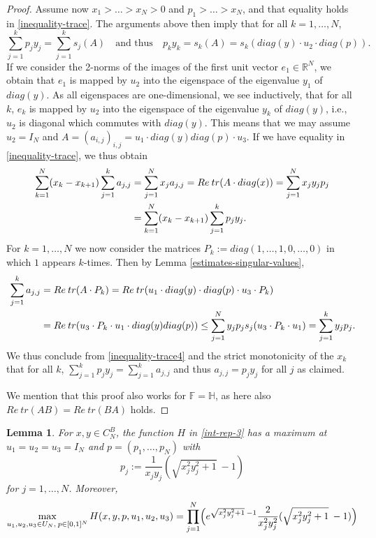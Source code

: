 \documentclass[reqno]{amsart}
\theoremstyle{plain}
\newtheorem{lemma}[theorem]{Lemma}
\theoremstyle{definition}
\numberwithin{equation}{section}
\begin{document}
\begin{proof}
 Assume now  $x_1>\ldots>x_N>0$ and $p_1>\ldots>x_N$, and that equality holds in \eqref{inequality-trace}. The arguments above
 then imply that for all $k=1,\ldots,N$,
$$\sum_{j=1}^k p_jy_j=\sum_{j=1}^k s_j(A) \quad\text{and thus}\quad  p_ky_k=s_k(A)=s_k(diag(y)  \cdot u_2 \cdot  diag(p)).$$
 If we consider the 2-norms of the images of the first unit vector $e_1\in\mathbb R^N$, we obtain that $e_1$
 is mapped by $u_2$ into the eigenspace of the eigenvalue $y_1$ of $diag(y)$. As all eigenspaces are one-dimensional, we see
 inductively, that for all $k$, $e_k$ is mapped by $u_2$ into the eigenspace of the eigenvalue $y_k$ of $diag(y)$, i.e.,
  $u_2$ is  diagonal  which commutes with $diag(y)$. This means that we may assume  $u_2=I_N$
  and  $A=(a_{i,j})_{i,j}=u_1 \cdot diag(y)   diag(p) \cdot u_3$.
 If we have equality in \eqref{inequality-trace}, we thus obtain 
 \begin{align} \label{inequality-trace4} 
   \sum_{k=1}^N (x_k-x_{k+1})\sum_{j=1}^k a_{j,j}&= \sum_{j=1}^N x_j a_{j,j} = Re\> tr(A\cdot diag(x))= \sum_{j=1}^Nx_jy_jp_j \notag\\
   &=
 \sum_{k=1}^N (x_k-x_{k+1})\sum_{j=1}^k p_jy_j .\end{align} 
For  $k=1,\ldots,N$ we now consider the matrices $P_k:=diag(1,\ldots,1,0,\ldots,0)$ in which $1$ appears $k$-times.
Then by Lemma \ref{estimates-singular-values},
\begin{align} \sum_{j=1}^k a_{j,j} &= Re\> tr(A\cdot P_k)=  Re\> tr(u_1 \cdot diag(y)  \cdot  diag(p) \cdot u_3 \cdot P_k)\notag\\
  &=  Re\> tr( u_3 \cdot P_k\cdot u_1 \cdot diag(y) diag(p))  \le
  \sum_{j=1}^N y_jp_j s_j( u_3 \cdot P_k\cdot u_1) = \sum_{j=1}^k y_jp_j  .\notag\end{align} 
  We thus conclude from \eqref{inequality-trace4} and the strict monotonicity of the $x_k$ that
  for all $k$, $\sum_{j=1}^k p_jy_j= \sum_{j=1}^k a_{j,j}$ and thus  $ a_{j,j}=p_jy_j$ for all $j$ as claimed.

   We mention that this proof also works for $\mathbb F=\mathbb H$, as here also
  $ Re\> tr(AB)= Re\> tr(BA)$ holds.
\end{proof}

\begin{lemma}\label{maxima-cone2}
  For $x,y\in C_N^B$, the function $H$ in \eqref{int-rep-3} has a maximum at $u_1=u_2=u_3=I_N$ and $p=(p_1,\ldots,p_N)$ with
  $$p_j:=\frac{1}{x_jy_j}(\sqrt{x_j^2y_j^2+1}\> -1)$$ for $j=1,\ldots,N$. Moreover,
  $$\max_{u_1,u_2,u_3\in U_N, \> p\in[0,1]^N} H(x,y,p, u_1,u_2,u_3)= \prod_{j=1}^N \Bigl( e^{\sqrt{ x_j^2y_j^2+1}\> -1}\frac{2}{x_j^2y_j^2}(\sqrt{x_j^2y_j^2+1}\> -1)\Bigr) $$
\end{lemma}
\end{document}
